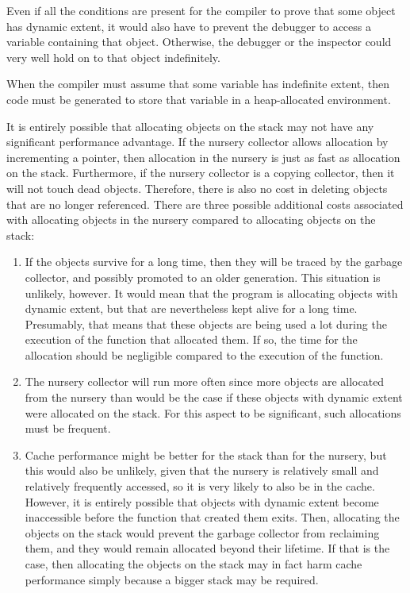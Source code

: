 Even if all the conditions are present for the compiler to prove that
some object has dynamic extent, it would also have to prevent the
debugger to access a variable containing that object.  Otherwise, the
debugger or the inspector could very well hold on to that object
indefinitely.

When the compiler must assume that some variable has indefinite
extent, then code must be generated to store that variable in a
heap-allocated environment.

It is entirely possible that allocating objects on the stack may not
have any significant performance advantage.  If the nursery collector
allows allocation by incrementing a pointer, then allocation in the
nursery is just as fast as allocation on the stack.  Furthermore, if
the nursery collector is a copying collector, then it will not touch
dead objects.  Therefore, there is also no cost in deleting objects
that are no longer referenced.  There are three possible additional
costs associated with allocating objects in the nursery compared to
allocating objects on the stack:

\begin{enumerate}
\item If the objects survive for a long time, then they will be traced
  by the garbage collector, and possibly promoted to an older
  generation.  This situation is unlikely, however.  It would mean
  that the program is allocating objects with dynamic extent, but that
  are nevertheless kept alive for a long time.  Presumably, that means
  that these objects are being used a lot during the execution of the
  function that allocated them.  If so, the time for the allocation
  should be negligible compared to the execution of the function.
\item The nursery collector will run more often since more objects are
  allocated from the nursery than would be the case if these objects
  with dynamic extent were allocated on the stack.  For this aspect to
  be significant, such allocations must be frequent.
\item Cache performance might be better for the stack than for the
  nursery, but this would also be unlikely, given that the nursery is
  relatively small and relatively frequently accessed, so it is very
  likely to also be in the cache.  However, it is entirely possible
  that objects with dynamic extent become inaccessible before the
  function that created them exits.  Then, allocating the objects on
  the stack would prevent the garbage collector from reclaiming them,
  and they would remain allocated beyond their lifetime.  If that is
  the case, then allocating the objects on the stack may in fact harm
  cache performance simply because a bigger stack may be required.
\end{enumerate}

